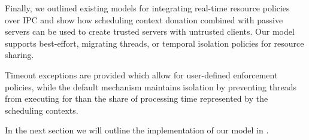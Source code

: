 Finally, we outlined existing models for integrating real-time resource policies over \gls{IPC} and
show how scheduling context donation combined with passive servers can be used to create trusted
servers with untrusted clients. 
Our model supports best-effort, migrating threads, or temporal isolation policies for resource sharing.

Timeout exceptions are provided which allow for user-defined enforcement policies, while the default
mechanism maintains isolation by preventing threads from executing for than the share of processing
time represented by the scheduling contexts.

In the next section we will outline the implementation of our model in \selfour. 
